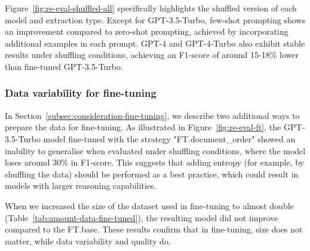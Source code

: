Figure~\ref{fig:re-eval-shuffled-all} specifically highlights the shuffled version of each model and extraction type. Except for GPT-3.5-Turbo, few-shot prompting shows an improvement compared to zero-shot prompting, achieved by incorporating additional examples in each prompt. 
GPT-4 and GPT-4-Turbo also exhibit stable results under shuffling conditions, achieving an F1-score of around 15-18\% lower than fine-tuned GPT-3.5-Turbo.

\subsubsection{Data variability for fine-tuning}
\label{subsubsec:data-variability}

In Section~\ref{subsec:consideration-fine-tuning}, we describe two additional ways to prepare the data for fine-tuning. 
As illustrated in Figure~\ref{fig:re-eval-ft}, the GPT-3.5-Turbo model fine-tuned with the strategy "FT.document\_order" showed an inability to generalise when evaluated under shuffling conditions, where the model loses around 30\% in F1-score.
This suggests that adding entropy (for example, by shuffling the data) should be performed as a best practice, which could result in models with larger reasoning capabilities.

When we increased the size of the dataset used in fine-tuning to almost double (Table~\ref{tab:amount-data-fine-tuned}), the resulting model did not improve compared to the FT.base. These results confirm that in fine-tuning, size does not matter, while data variability and quality do. 






